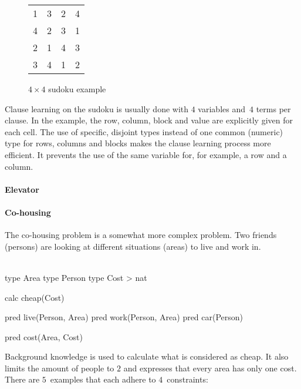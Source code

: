 \begin{figure}[!htp]
	\centering
	\begin{tabular}{|cc|cc|}
		\hline
		1 & 3 & 2 & 4 \\
		4 & 2 & 3 & 1 \\ \hline
		2 & 1 & 4 & 3 \\
		3 & 4 & 1 & 2 \\ \hline
	\end{tabular}
	\label{fig:setup_sudoku}
	\caption{$4 \times 4$ sudoku example}
\end{figure}

Clause learning on the sudoku is usually done with $4$ variables and~$4$ terms per clause.
In the example, the row, column, block and value are explicitly given for each cell.
The use of specific, disjoint types instead of one common (numeric) type for rows, columns and blocks makes the clause learning process more efficient.
It prevents the use of the same variable for, for example, a row and a column.

\paragraph{Elevator}

\paragraph{Co-housing}
The co-housing problem is a somewhat more complex problem.
Two friends (persons) are looking at different situations (areas) to live and work in.
\\\\
\begin{minipage}{0.5\textwidth}
	\begin{verbatim*}
		type Area
		type Person
		type Cost > nat

		calc cheap(Cost)
	\end{verbatim*}
\end{minipage}
\begin{minipage}{0.5\textwidth}
	\begin{verbatim*}
		pred live(Person, Area)
		pred work(Person, Area)
		pred car(Person)

		pred cost(Area, Cost)
	\end{verbatim*}
\end{minipage}

Background knowledge is used to calculate what is considered as cheap. It also limits the amount of people to $2$ and expresses that every area has only one cost. There are $5$~examples that each adhere to $4$~constraints:

